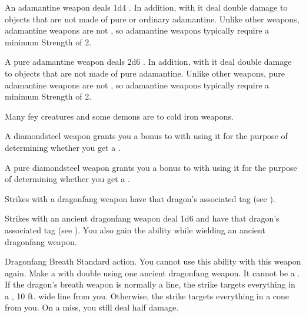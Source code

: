        An adamantine weapon deals 1d4 .
      In addition,  with it deal double damage to objects that are not made of pure or ordinary adamantine.
      Unlike other weapons, adamantine weapons are not , so  adamantine weapons typically require a minimum Strength of 2.

       A pure adamantine weapon deals 2d6 .
      In addition,  with it deal double damage to objects that are not made of pure adamantine.
      Unlike other weapons, pure adamantine weapons are not , so  adamantine weapons typically require a minimum Strength of 2.

       Many fey creatures and some demons are  to cold iron weapons.

       A diamondsteel weapon grants you a  bonus to  with  using it for the purpose of determining whether you get a .

       A pure diamondsteel weapon grants you a  bonus to  with  using it for the purpose of determining whether you get a .

       Strikes with a dragonfang weapon have that dragon's associated tag (see ).

       Strikes with an ancient dragonfang weapon deal 1d6  and have that dragon's associated tag (see ).
      You also gain the  ability while wielding an ancient dragonfang weapon.
      \begin{activeability}{Dragonfang Breath}
        \abilityusagetime Standard action.
        \abilitycost You  cannot use this ability with this weapon again.
        \rankline
        Make a  with double  using one ancient dragonfang weapon.
        It cannot be a .
        If the dragon's breath weapon is normally a line, the strike targets everything in a \arealarge, 10 ft. wide line from you.
        Otherwise, the strike targets everything in a \areamed cone from you.
        On a miss, you still deal half damage.
      \end{activeability}

